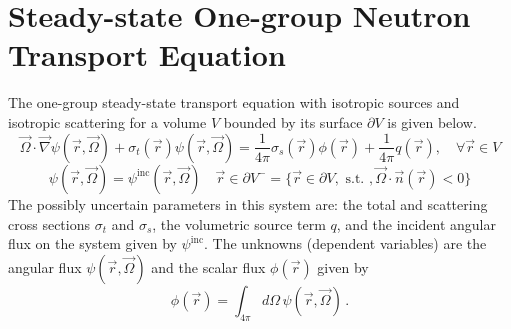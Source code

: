 \documentclass[12pt]{report}
\newcommand{\vr}{\vec{r}}
\newcommand{\vO}{\vec{\Omega}}
\newcommand{\grad}{\vec{\nabla}}
\newcommand{\sigt}{\sigma_t}
\newcommand{\sigs}{\sigma_s}
\begin{document}
\section{Steady-state One-group Neutron Transport Equation}

The one-group steady-state transport equation with isotropic sources and isotropic scattering for a volume $V$ bounded by its surface $\partial V$ is given below.
\begin{equation}
\label{SS1GTE}
\vO \cdot \grad \psi(\vr,\vO) + \sigt(\vr) \psi(\vr,\vO) = \frac{1}{4 \pi} \sigs(\vr) \phi(\vr) + \frac{1}{4 \pi} q(\vr), \quad \forall \vr \in V
\end{equation}
\begin{equation}
\label{SS1GTE_bc}
\psi(\vr,\vO) = \psi^{\text{inc}}(\vr,\vO) \quad \vr \in \partial V^{-} = \{ \vr \in \partial V, \text{ s.t. }, \vO \cdot \vec{n}(\vr) < 0\}
\end{equation}
The possibly uncertain parameters in this system are: the total and scattering cross sections $\sigt$ and $\sigs$, the volumetric source term $q$, and the incident angular flux on the system given by $\psi^{\text{inc}}$. The unknowns (dependent variables) are the angular flux $\psi(\vr,\vO)$ and the scalar flux $\phi(\vr)$ given by
\[
\phi(\vr) = \int_{4\pi}d\Omega\,\psi(\vr,\vO) \,.
\]

\end{document}
